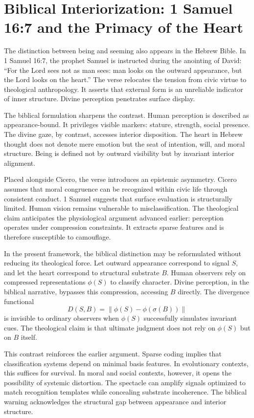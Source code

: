 \documentclass[11pt]{article}
\begin{document}
\section{Biblical Interiorization: 1 Samuel 16:7 and the Primacy of the Heart}

The distinction between being and seeming also appears in the Hebrew Bible. In 1 Samuel 16:7, the prophet Samuel is instructed during the anointing of David: ``For the Lord sees not as man sees: man looks on the outward appearance, but the Lord looks on the heart.'' The verse relocates the tension from civic virtue to theological anthropology. It asserts that external form is an unreliable indicator of inner structure. Divine perception penetrates surface display.

The biblical formulation sharpens the contrast. Human perception is described as appearance-bound. It privileges visible markers: stature, strength, social presence. The divine gaze, by contrast, accesses interior disposition. The heart in Hebrew thought does not denote mere emotion but the seat of intention, will, and moral structure. Being is defined not by outward visibility but by invariant interior alignment.

Placed alongside Cicero, the verse introduces an epistemic asymmetry. Cicero assumes that moral congruence can be recognized within civic life through consistent conduct. 1 Samuel suggests that surface evaluation is structurally limited. Human vision remains vulnerable to misclassification. The theological claim anticipates the physiological argument advanced earlier: perception operates under compression constraints. It extracts sparse features and is therefore susceptible to camouflage.

In the present framework, the biblical distinction may be reformulated without reducing its theological force. Let outward appearance correspond to signal $S$, and let the heart correspond to structural substrate $B$. Human observers rely on compressed representations $\phi(S)$ to classify character. Divine perception, in the biblical narrative, bypasses this compression, accessing $B$ directly. The divergence functional
\[
D(S,B) = \|\phi(S) - \phi(\sigma(B))\|
\]
is invisible to ordinary observers when $\phi(S)$ successfully simulates invariant cues. The theological claim is that ultimate judgment does not rely on $\phi(S)$ but on $B$ itself.

This contrast reinforces the earlier argument. Sparse coding implies that classification systems depend on minimal basis features. In evolutionary contexts, this suffices for survival. In moral and social contexts, however, it opens the possibility of systemic distortion. The spectacle can amplify signals optimized to match recognition templates while concealing substrate incoherence. The biblical warning acknowledges the structural gap between appearance and interior structure.
\end{document}
